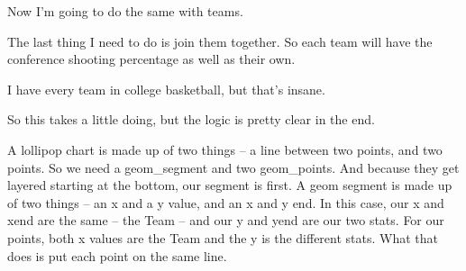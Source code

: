 \documentclass[]{book}
\newenvironment{Shaded}{\begin{snugshade}}{\end{snugshade}}
\newcommand{\KeywordTok}[1]{\textcolor[rgb]{0.13,0.29,0.53}{\textbf{#1}}}
\newcommand{\DataTypeTok}[1]{\textcolor[rgb]{0.13,0.29,0.53}{#1}}
\newcommand{\StringTok}[1]{\textcolor[rgb]{0.31,0.60,0.02}{#1}}
\newcommand{\OperatorTok}[1]{\textcolor[rgb]{0.81,0.36,0.00}{\textbf{#1}}}
\newcommand{\NormalTok}[1]{#1}
\begin{document}
Now I'm going to do the same with teams.

\begin{Shaded}
\end{Shaded}

The last thing I need to do is join them together. So each team will
have the conference shooting percentage as well as their own.

\begin{Shaded}
\end{Shaded}

I have every team in college basketball, but that's insane.

\begin{Shaded}
\end{Shaded}

So this takes a little doing, but the logic is pretty clear in the end.

A lollipop chart is made up of two things -- a line between two points,
and two points. So we need a geom\_segment and two geom\_points. And
because they get layered starting at the bottom, our segment is first. A
geom segment is made up of two things -- an x and a y value, and an x
and y end. In this case, our x and xend are the same -- the Team -- and
our y and yend are our two stats. For our points, both x values are the
Team and the y is the different stats. What that does is put each point
on the same line.
\end{document}
